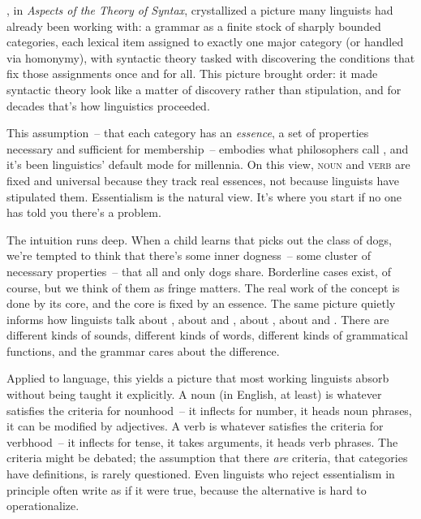 \textcite{chomsky1965}, in \textit{Aspects of the Theory of Syntax}, crystallized a picture many linguists had already been working with: a grammar as a finite stock of sharply bounded categories, each lexical item assigned to exactly one major category (or handled via homonymy), with syntactic theory tasked with discovering the conditions that fix those assignments once and for all. This picture brought order: it made syntactic theory look like a matter of discovery rather than stipulation, and for decades that's how linguistics proceeded.

This assumption~-- that each category has an \emph{essence}, a set of properties necessary and sufficient for membership~-- embodies what philosophers call , and it's been linguistics' default mode for millennia. On this view, \textsc{noun} and \textsc{verb} are fixed and universal because they track real essences, not because linguists have stipulated them. Essentialism is the natural view. It's where you start if no one has told you there's a problem.

The intuition runs deep. When a child learns that  picks out the class of dogs, we're tempted to think that there's some inner dogness~-- some cluster of necessary properties~-- that all and only dogs share. Borderline cases exist, of course, but we think of them as fringe matters. The real work of the concept is done by its core, and the core is fixed by an essence. The same picture quietly informs how linguists talk about , about  and , about , about  and . There are different kinds of sounds, different kinds of words, different kinds of grammatical functions, and the grammar cares about the difference.

Applied to language, this yields a picture that most working linguists absorb without being taught it explicitly. A noun (in English, at least) is whatever satisfies the criteria for nounhood~-- it inflects for number, it heads noun phrases, it can be modified by adjectives. A verb is whatever satisfies the criteria for verbhood~-- it inflects for tense, it takes arguments, it heads verb phrases. The criteria might be debated; the assumption that there \emph{are} criteria, that categories have definitions, is rarely questioned. Even linguists who reject essentialism in principle often write as if it were true, because the alternative is hard to operationalize.


